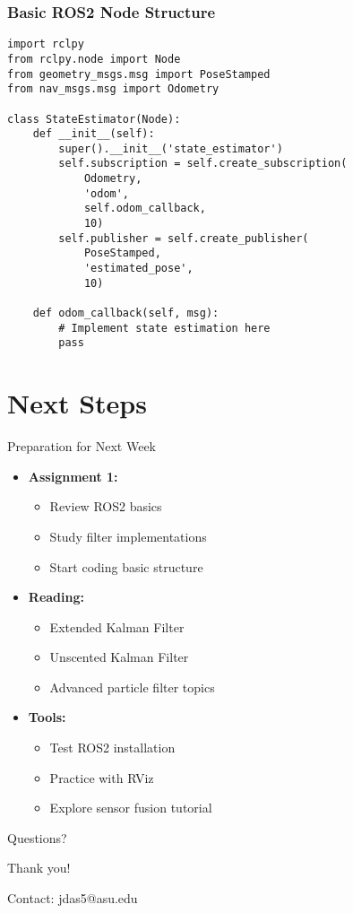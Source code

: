 \documentclass[aspectratio=169]{beamer}
\begin{document}
\begin{frame}[fragile]
\frametitle{Basic ROS2 Node Structure}
\begin{lstlisting}
import rclpy
from rclpy.node import Node
from geometry_msgs.msg import PoseStamped
from nav_msgs.msg import Odometry

class StateEstimator(Node):
    def __init__(self):
        super().__init__('state_estimator')
        self.subscription = self.create_subscription(
            Odometry,
            'odom',
            self.odom_callback,
            10)
        self.publisher = self.create_publisher(
            PoseStamped,
            'estimated_pose',
            10)
            
    def odom_callback(self, msg):
        # Implement state estimation here
        pass
\end{lstlisting}
\end{frame}

\section{Next Steps}

\begin{frame}{Preparation for Next Week}
    \begin{itemize}
        \item<1-> \textbf{Assignment 1:}
            \begin{itemize}
                \item Review ROS2 basics
                \item Study filter implementations
                \item Start coding basic structure
            \end{itemize}
        \item<2-> \textbf{Reading:}
            \begin{itemize}
                \item Extended Kalman Filter
                \item Unscented Kalman Filter
                \item Advanced particle filter topics
            \end{itemize}
        \item<3-> \textbf{Tools:}
            \begin{itemize}
                \item Test ROS2 installation
                \item Practice with RViz
                \item Explore sensor fusion tutorial
            \end{itemize}
    \end{itemize}
\end{frame}

\begin{frame}{Questions?}
    \begin{center}
        \Huge Thank you!
        
        \vspace{1cm}
        \normalsize
        Contact: jdas5@asu.edu
    \end{center}
\end{frame}
\end{document}

